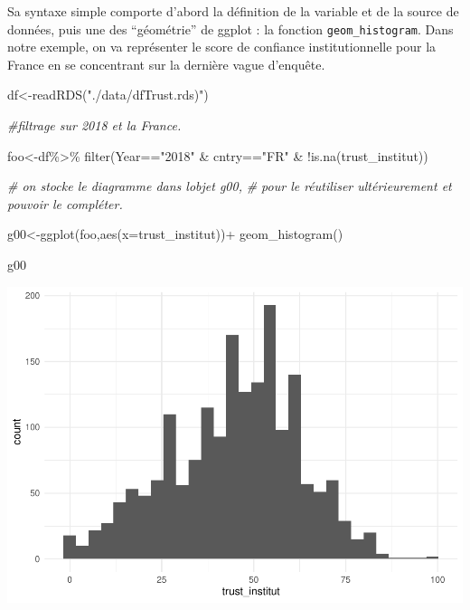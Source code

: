 \documentclass[
]{book}
\newenvironment{Shaded}{\begin{snugshade}}{\end{snugshade}}
\newcommand{\AttributeTok}[1]{\textcolor[rgb]{0.77,0.63,0.00}{#1}}
\newcommand{\CommentTok}[1]{\textcolor[rgb]{0.56,0.35,0.01}{\textit{#1}}}
\newcommand{\FunctionTok}[1]{\textcolor[rgb]{0.00,0.00,0.00}{#1}}
\newcommand{\NormalTok}[1]{#1}
\newcommand{\OtherTok}[1]{\textcolor[rgb]{0.56,0.35,0.01}{#1}}
\newcommand{\SpecialCharTok}[1]{\textcolor[rgb]{0.00,0.00,0.00}{#1}}
\newcommand{\StringTok}[1]{\textcolor[rgb]{0.31,0.60,0.02}{#1}}
\begin{document}
Sa syntaxe simple comporte d'abord la définition de la variable et de la source de données, puis une des ``géométrie'' de ggplot : la fonction \texttt{geom\_histogram}. Dans notre exemple, on va représenter le score de confiance institutionnelle pour la France en se concentrant sur la dernière vague d'enquête.

\begin{Shaded}
\begin{Highlighting}[]
\NormalTok{df}\OtherTok{\textless{}{-}}\FunctionTok{readRDS}\NormalTok{(}\StringTok{"./data/dfTrust.rds)"}\NormalTok{)}

\CommentTok{\#filtrage sur 2018 et la France.}

\NormalTok{foo}\OtherTok{\textless{}{-}}\NormalTok{df}\SpecialCharTok{\%\textgreater{}\%}
  \FunctionTok{filter}\NormalTok{(Year}\SpecialCharTok{==}\StringTok{"2018"} \SpecialCharTok{\&}\NormalTok{ cntry}\SpecialCharTok{==}\StringTok{"FR"} \SpecialCharTok{\&} \SpecialCharTok{!}\FunctionTok{is.na}\NormalTok{(trust\_institut)) }

\CommentTok{\# on stocke le diagramme dans l\textquotesingle{}objet g00, }
\CommentTok{\# pour le réutiliser ultérieurement et pouvoir le compléter.}

\NormalTok{g00}\OtherTok{\textless{}{-}}\FunctionTok{ggplot}\NormalTok{(foo,}\FunctionTok{aes}\NormalTok{(}\AttributeTok{x=}\NormalTok{trust\_institut))}\SpecialCharTok{+}
  \FunctionTok{geom\_histogram}\NormalTok{()}

\NormalTok{g00}
\end{Highlighting}
\end{Shaded}

\includegraphics{bookdown-demo_files/figure-latex/302-1.pdf}
\end{document}
